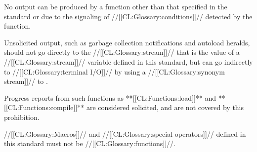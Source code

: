 
 
No output can be produced by a function other than that specified in
the standard or due to the signaling of //[[CL:Glossary:conditions]]//
detected by the function.
 
Unsolicited output, such as garbage collection notifications and
autoload heralds, should not go directly to the //[[CL:Glossary:stream]]//
that is the value of a //[[CL:Glossary:stream]]// variable defined in this
standard, but can go indirectly to //[[CL:Glossary:terminal I/O]]// by using a
//[[CL:Glossary:synonym stream]]// to .
 
Progress reports from such functions as **[[CL:Functions:load]]** and
**[[CL:Functions:compile]]** are considered solicited, and are not covered by
this prohibition.


 












//[[CL:Glossary:Macros]]// and //[[CL:Glossary:special operators]]// defined in this standard
must not be //[[CL:Glossary:functions]]//.


\endlist

